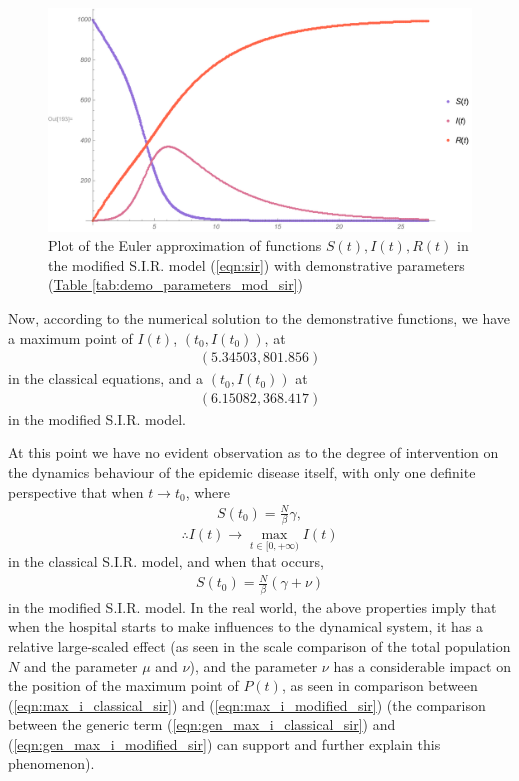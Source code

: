 \documentclass{article}
\newcommand{\MRef}[2]{\hyperref[#2]{#1 \ref*{#2}}}
\begin{document}
\begin{figure}[htbp]
    \centering
    \includegraphics[scale=.45, clip, trim=37.5pt 0 0 0]{AdaptiveEulerModifiedSIR.pdf}
    \caption{Plot of the Euler approximation of functions $S(t), I(t), R(t)$ in the modified S.I.R. model (\ref{eqn:sir}) with demonstrative parameters (\MRef{Table}{tab:demo_parameters_mod_sir})}
    \label{fig:euler_mod_sir}
\end{figure}

Now, according to the numerical solution to the demonstrative functions, we have a maximum point of $I(t)$, $(t_0,I(t_0))$, at \begin{gather}\label{eqn:max_i_classical_sir}(5.34503, 801.856)\end{gather} in the classical equations, and a $(t_0,I(t_0))$ at \begin{gather}\label{eqn:max_i_modified_sir}(6.15082, 368.417)\end{gather} in the modified S.I.R. model.

At this point we have no evident observation as to the degree of intervention on the dynamics behaviour of the epidemic disease itself, with only one definite perspective that when $t\to t_0$, where \begin{gather}\label{eqn:gen_max_i_classical_sir}S(t_0)=\frac{N}{\beta}\gamma,\end{gather} $$\displaystyle{\therefore I(t)\to\max_{t\in[0,+\infty)}I(t)}$$ in the classical S.I.R. model, and when that occurs, \begin{gather}\label{eqn:gen_max_i_modified_sir}S(t_0)=\frac{N}{\beta}\left(\gamma+\nu\right)\end{gather} in the modified S.I.R. model. In the real world, the above properties imply that when the hospital starts to make influences to the dynamical system, it has a relative large-scaled effect (as seen in the scale comparison of the total population $N$ and the parameter $\mu$ and $\nu$), and the parameter $\nu$ has a considerable impact on the position of the maximum point of $P(t)$, as seen in comparison between (\ref{eqn:max_i_classical_sir}) and (\ref{eqn:max_i_modified_sir}) (the comparison between the generic term (\ref{eqn:gen_max_i_classical_sir}) and (\ref{eqn:gen_max_i_modified_sir}) can support and further explain this phenomenon).
\end{document}
